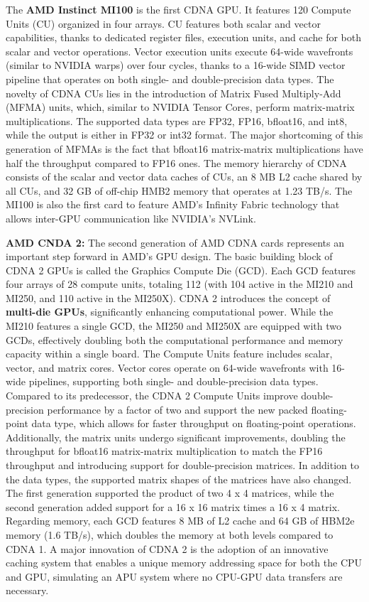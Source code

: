 The \textbf{AMD Instinct MI100} is the first CDNA GPU.
It features 120 Compute Units (CU) organized in four arrays. CU features both scalar and vector capabilities, thanks to dedicated register files, execution units, and cache for both scalar and vector operations. Vector execution units execute 64-wide wavefronts (similar to NVIDIA warps) over four cycles, thanks to a 16-wide SIMD vector pipeline that operates on both single- and double-precision data types.
The novelty of CDNA CUs lies in the introduction of Matrix Fused Multiply-Add (MFMA) units, which, similar to NVIDIA Tensor Cores, perform matrix-matrix multiplications. The supported data types are FP32, FP16, bfloat16, and int8, while the output is either in FP32 or int32 format. The major shortcoming of this generation of MFMAs is the fact that bfloat16 matrix-matrix multiplications have half the throughput compared to FP16 ones.
The memory hierarchy of CDNA consists of the scalar and vector data caches of CUs, an 8 MB L2 cache shared by all CUs, and 32 GB of off-chip HMB2 memory that operates at 1.23 TB/s.
The MI100 is also the first card to feature AMD's Infinity Fabric technology that allows inter-GPU communication like NVIDIA's NVLink.

\textbf{AMD CNDA 2:} The second generation of AMD CDNA cards represents an important step forward in AMD's GPU design.
The basic building block of CDNA 2 GPUs is called the Graphics Compute Die (GCD). Each GCD features four arrays of 28 compute units, totaling 112 (with 104 active in the MI210 and MI250, and 110 active in the MI250X). CDNA 2 introduces the concept of \textbf{multi-die GPUs}, significantly enhancing computational power. While the MI210 features a single GCD, the MI250 and MI250X are equipped with two GCDs, effectively doubling both the computational performance and memory capacity within a single board.
The Compute Units feature includes scalar, vector, and matrix cores. Vector cores operate on 64-wide wavefronts with 16-wide pipelines, supporting both single- and double-precision data types. Compared to its predecessor, the CDNA 2 Compute Units improve double-precision performance by a factor of two and support the new packed floating-point data type, which allows for faster throughput on floating-point operations.
Additionally, the matrix units undergo significant improvements, doubling the throughput for bfloat16 matrix-matrix multiplication to match the FP16 throughput and introducing support for double-precision matrices. 
In addition to the data types, the supported matrix shapes of the matrices have also changed. The first generation supported the product of two 4 x 4 matrices, while the second generation added support for a 16 x 16 matrix times a 16 x 4 matrix.
Regarding memory, each GCD features 8 MB of L2 cache and 64 GB of HBM2e memory (1.6 TB/s), which doubles the memory at both levels compared to CDNA 1.
A major innovation of CDNA 2 is the adoption of an innovative caching system that enables a unique memory addressing space for both the CPU and GPU, simulating an APU system where no CPU-GPU data transfers are necessary. 


